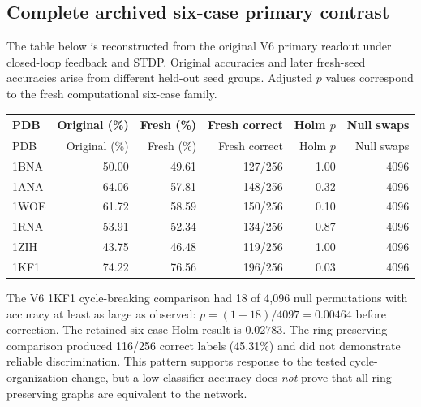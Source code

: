 \documentclass[11pt,a4paper]{article}
\begin{document}
\subsection{Complete archived six-case primary contrast}
The table below is reconstructed from the original V6 primary readout under closed-loop feedback and STDP. Original accuracies and later fresh-seed accuracies arise from different held-out seed groups. Adjusted $p$ values correspond to the fresh computational six-case family.
\begin{center}\footnotesize
\begin{longtable}{lrrrrr}
\toprule
PDB & Original (\%) & Fresh (\%) & Fresh correct & Holm $p$ & Null swaps\\
\midrule
\endfirsthead
\toprule
PDB & Original (\%) & Fresh (\%) & Fresh correct & Holm $p$ & Null swaps\\
\midrule
\endhead
1BNA & 50.00 & 49.61 & 127/256 & 1.00 & 4096\\
1ANA & 64.06 & 57.81 & 148/256 & 0.32 & 4096\\
1WOE & 61.72 & 58.59 & 150/256 & 0.10 & 4096\\
1RNA & 53.91 & 52.34 & 134/256 & 0.87 & 4096\\
1ZIH & 43.75 & 46.48 & 119/256 & 1.00 & 4096\\
1KF1 & 74.22 & 76.56 & 196/256 & 0.03 & 4096\\
\bottomrule
\end{longtable}
\end{center}

The V6 1KF1 cycle-breaking comparison had 18 of 4,096 null permutations with accuracy at least as large as observed: $p=(1+18)/4097=0.00464$ before correction. The retained six-case Holm result is $0.02783$. The ring-preserving comparison produced 116/256 correct labels (45.31\%) and did not demonstrate reliable discrimination. This pattern supports response to the tested cycle-organization change, but a low classifier accuracy does \emph{not} prove that all ring-preserving graphs are equivalent to the network.
\end{document}

